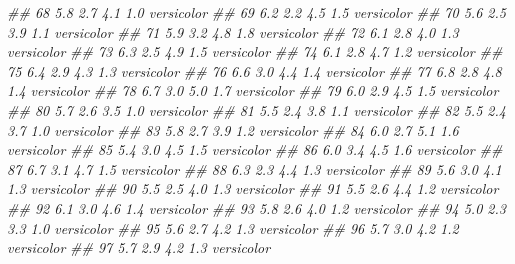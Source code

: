 \documentclass[
  13,
  letterpaper,
]{report}
\newenvironment{Shaded}{\begin{snugshade}}{\end{snugshade}}
\newcommand{\DocumentationTok}[1]{\textcolor[rgb]{0.37,0.37,0.37}{\textit{#1}}}
\begin{document}
\begin{Shaded}
\begin{Highlighting}[]
\DocumentationTok{\#\# 68           5.8         2.7          4.1         1.0 versicolor}
\DocumentationTok{\#\# 69           6.2         2.2          4.5         1.5 versicolor}
\DocumentationTok{\#\# 70           5.6         2.5          3.9         1.1 versicolor}
\DocumentationTok{\#\# 71           5.9         3.2          4.8         1.8 versicolor}
\DocumentationTok{\#\# 72           6.1         2.8          4.0         1.3 versicolor}
\DocumentationTok{\#\# 73           6.3         2.5          4.9         1.5 versicolor}
\DocumentationTok{\#\# 74           6.1         2.8          4.7         1.2 versicolor}
\DocumentationTok{\#\# 75           6.4         2.9          4.3         1.3 versicolor}
\DocumentationTok{\#\# 76           6.6         3.0          4.4         1.4 versicolor}
\DocumentationTok{\#\# 77           6.8         2.8          4.8         1.4 versicolor}
\DocumentationTok{\#\# 78           6.7         3.0          5.0         1.7 versicolor}
\DocumentationTok{\#\# 79           6.0         2.9          4.5         1.5 versicolor}
\DocumentationTok{\#\# 80           5.7         2.6          3.5         1.0 versicolor}
\DocumentationTok{\#\# 81           5.5         2.4          3.8         1.1 versicolor}
\DocumentationTok{\#\# 82           5.5         2.4          3.7         1.0 versicolor}
\DocumentationTok{\#\# 83           5.8         2.7          3.9         1.2 versicolor}
\DocumentationTok{\#\# 84           6.0         2.7          5.1         1.6 versicolor}
\DocumentationTok{\#\# 85           5.4         3.0          4.5         1.5 versicolor}
\DocumentationTok{\#\# 86           6.0         3.4          4.5         1.6 versicolor}
\DocumentationTok{\#\# 87           6.7         3.1          4.7         1.5 versicolor}
\DocumentationTok{\#\# 88           6.3         2.3          4.4         1.3 versicolor}
\DocumentationTok{\#\# 89           5.6         3.0          4.1         1.3 versicolor}
\DocumentationTok{\#\# 90           5.5         2.5          4.0         1.3 versicolor}
\DocumentationTok{\#\# 91           5.5         2.6          4.4         1.2 versicolor}
\DocumentationTok{\#\# 92           6.1         3.0          4.6         1.4 versicolor}
\DocumentationTok{\#\# 93           5.8         2.6          4.0         1.2 versicolor}
\DocumentationTok{\#\# 94           5.0         2.3          3.3         1.0 versicolor}
\DocumentationTok{\#\# 95           5.6         2.7          4.2         1.3 versicolor}
\DocumentationTok{\#\# 96           5.7         3.0          4.2         1.2 versicolor}
\DocumentationTok{\#\# 97           5.7         2.9          4.2         1.3 versicolor}

\end{Highlighting}
\end{Shaded}
\end{document}
